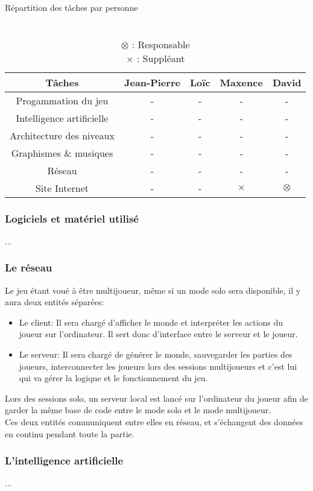 \documentclass{article}
\begin{document}
\begin{table}[h!]
    \centering
    \caption*{Répartition des tâches par personne}
    \begin{tabular}{ |c|c|c|c|c| }
        \hline
        Tâches & Jean-Pierre & Loïc & Maxence & David \\
        \hline
        Progammation du jeu & - & - & - & - \\
        \hline
        Intelligence artificielle & - & - & - & - \\
        \hline
        Architecture des niveaux & - & - & - & - \\
        \hline
        Graphismes \& musiques & - & - & - & - \\
        \hline
        Réseau & - & - & - & - \\
        \hline
        Site Internet & - & - & $\times$ & $\otimes$ \\
        \hline
    \end{tabular}
    \caption*{
        \\ $\otimes$ : Responsable
        \\ $\times$ : Suppléant
    }
    \label{table:repartition}
\end{table}

\subsubsection{Logiciels et matériel utilisé}

...

\subsubsection{Le réseau}

Le jeu étant voué à être multijoueur, même si un mode solo sera disponible, il y aura deux entités séparées:

\begin{itemize}
    \item Le client:  Il sera chargé d'afficher le monde et interpréter les actions du joueur sur l'ordinateur. Il sert donc d'interface entre le serveur et le joueur.
    
    \item Le serveur: Il sera chargé de générer le monde, sauvegarder les parties des joueurs, interconnecter les joueurs lors des sessions multijoueurs et c'est lui qui va gérer la logique et le fonctionnement du jeu.
\end{itemize}

Lors des sessions solo, un serveur local est lancé sur l'ordinateur du joueur afin de garder la même base de code entre le mode solo et le mode multijoueur. \\
Ces deux entités communiquent entre elles en réseau, et s'échangent des données en continu pendant toute la partie.

\subsubsection{L'intelligence artificielle}

...
\end{document}
